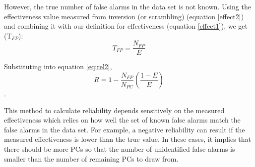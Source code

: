 However, the true number of false alarms in the \opstce{} data set is not known. Using the effectiveness value measured from inversion (or scrambling) (equation \ref{effect2}) and combining it with our definition for effectiveness (equation \ref{effect1}), we get (T$_{FP}$):
\begin{equation}
T_{FP} = \frac{N_{FP}}{E} 
\end{equation}

Substituting into equation \ref{eq:rel2},
\textbf{
\begin{equation}
R= 1 - \frac{N_{FP}}{N_{PC}}\left(\frac{1-E}{E}\right)
\end{equation}
}.




This method to calculate reliability depends sensitively on the measured effectiveness which relies on how well the set of known false alarms match the false alarms in the \opstce{} data set. For example, a negative reliability can result if the measured effectiveness is lower than the true value. In these cases, it implies that there should be more PCs so that the number of unidentified false alarms is smaller than the number of remaining PCs to draw from.  


